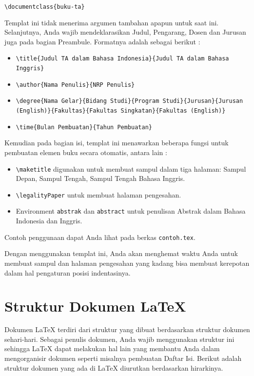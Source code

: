 \documentclass{ta-its}
\begin{document}
        \texttt{\textbackslash{}documentclass\{buku-ta\}}
        
        Templat ini tidak menerima argumen tambahan apapun untuk saat ini. Selanjutnya, Anda wajib mendeklarasikan Judul, Pengarang, Dosen dan Jurusan juga pada bagian Preambule. Formatnya adalah sebagai berikut :
        
        \begin{itemize}
        	\item \texttt{\textbackslash{}title\{Judul TA dalam Bahasa Indonesia\}\{Judul TA dalam Bahasa Inggris\}}
        	\item \texttt{\textbackslash{}author\{Nama Penulis\}\{NRP Penulis\}}
        	\item \texttt{\textbackslash{}degree\{Nama Gelar\}\{Bidang Studi\}\{Program Studi\}\{Jurusan\}\{Jurusan (English)\}\{Fakultas\}\{Fakultas Singkatan\}\{Fakultas (English)\}}
        	\item \texttt{\textbackslash{}time\{Bulan Pembuatan\}\{Tahun Pembuatan\}}
        \end{itemize}
        
        Kemudian pada bagian isi, templat ini menawarkan beberapa fungsi untuk pembuatan elemen buku secara otomatis, antara lain :
        
        \begin{itemize}
        	\item \texttt{\textbackslash{}maketitle} digunakan untuk membuat sampul dalam tiga halaman: Sampul Depan, Sampul Tengah, Sampul Tengah Bahasa Inggris.
        	\item \texttt{\textbackslash{}legalityPaper} untuk membuat halaman pengesahan.
        	\item Environment \texttt{abstrak} dan \texttt{abstract} untuk penulisan Abstrak dalam Bahasa Indonesia dan Inggris.
        \end{itemize}
        
        Contoh penggunaan dapat Anda lihat pada berkas \texttt{contoh.tex}.
        
        Dengan menggunakan templat ini, Anda akan menghemat waktu Anda untuk membuat sampul dan halaman pengesahan yang kadang bisa membuat kerepotan dalam hal pengaturan posisi indentasinya.
        
        \section{Struktur Dokumen \LaTeX{}}
        Dokumen \LaTeX{} terdiri dari struktur yang dibuat berdasarkan struktur dokumen sehari-hari. Sebagai penulis dokumen, Anda wajib menggunakan struktur ini sehingga \LaTeX{} dapat melakukan hal lain yang membantu Anda dalam mengorganisir dokumen seperti misalnya pembuatan Daftar Isi. Berikut adalah struktur dokumen yang ada di \LaTeX{} diurutkan berdasarkan hirarkinya.
        
\end{document}
